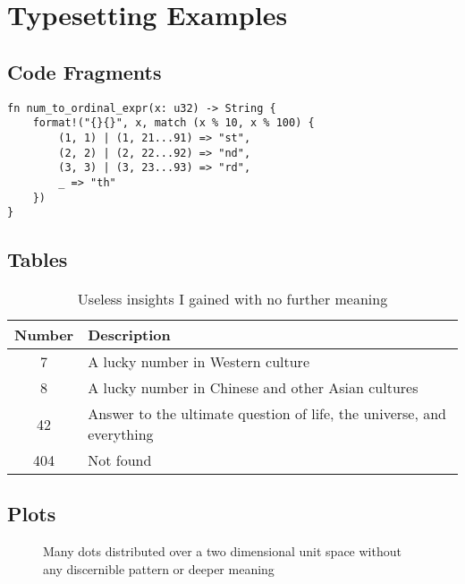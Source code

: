 \documentclass[a4paper,11pt,oneside]{article}
\begin{document}
  \nocite{JS06}

  \newpage
  \printbibliography

  \clearpage
  \appendix
  \section{Typesetting Examples}

  \subsection{Code Fragments}

  \begin{verbatim}
fn num_to_ordinal_expr(x: u32) -> String {
    format!("{}{}", x, match (x % 10, x % 100) {
        (1, 1) | (1, 21...91) => "st", 
        (2, 2) | (2, 22...92) => "nd", 
        (3, 3) | (3, 23...93) => "rd", 
        _ => "th" 
    }) 
} 
  \end{verbatim}

  \subsection{Tables}

  \begin{table}[ht]
    \begin{center}
      \begin{tabular}{cl}
        \toprule
        Number & Description \\
        \midrule
        7 & A lucky number in Western culture \\
        8 & A lucky number in Chinese and other Asian cultures \\
        42 & Answer to the ultimate question of life, the universe, and everything \\
        404 & Not found \\
        \bottomrule
      \end{tabular}
      \caption{Useless insights I gained with no further meaning}
    \end{center}
  \end{table}
  
  \subsection{Plots}

  \begin{figure}[ht]
    \begin{center}
    \end{center}
    \caption{Many dots distributed over a two dimensional unit space
      without any discernible pattern or deeper meaning}
  \end{figure}
\end{document}
